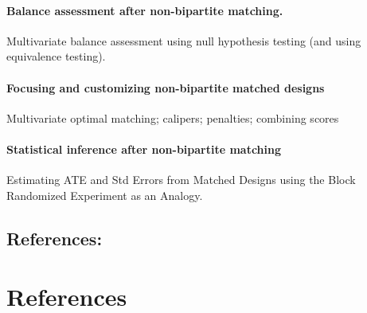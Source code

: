 \documentclass[10pt]{article}
\begin{document}
\paragraph*{Balance assessment after non-bipartite matching.} Multivariate balance assessment using null hypothesis testing (and using equivalence testing).
\paragraph*{Focusing and customizing non-bipartite matched designs} Multivariate optimal matching; calipers; penalties; combining scores
\paragraph*{Statistical inference after non-bipartite matching} Estimating ATE and Std Errors from Matched Designs using the Block Randomized Experiment as an Analogy.

\subsection*{References:}

\citealp[Chap 11 \& 12]{rosenbaum2010design}

\citealp{lu2011optimal}

\section*{References}



  
\end{document}
